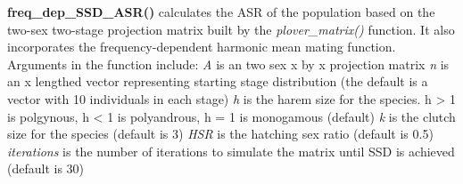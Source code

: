 \documentclass[]{article}
\newenvironment{Shaded}{\begin{snugshade}}{\end{snugshade}}
\newcommand{\KeywordTok}[1]{\textcolor[rgb]{0.13,0.29,0.53}{\textbf{{#1}}}}
\newcommand{\DataTypeTok}[1]{\textcolor[rgb]{0.13,0.29,0.53}{{#1}}}
\newcommand{\DecValTok}[1]{\textcolor[rgb]{0.00,0.00,0.81}{{#1}}}
\newcommand{\StringTok}[1]{\textcolor[rgb]{0.31,0.60,0.02}{{#1}}}
\newcommand{\OtherTok}[1]{\textcolor[rgb]{0.56,0.35,0.01}{{#1}}}
\newcommand{\NormalTok}[1]{{#1}}
\begin{document}
\begin{Shaded}
\end{Shaded}

\textbf{freq\_dep\_SSD\_ASR()} calculates the ASR of the population
based on the two-sex two-stage projection matrix built by the
\emph{plover\_matrix()} function. It also incorporates the
frequency-dependent harmonic mean mating function. Arguments in the
function include: \emph{A} is an two sex x by x projection matrix
\emph{n} is an x lengthed vector representing starting stage
distribution (the default is a vector with 10 individuals in each stage)
\emph{h} is the harem size for the species. h \textgreater{} 1 is
polgynous, h \textless{} 1 is polyandrous, h = 1 is monogamous (default)
\emph{k} is the clutch size for the species (default is 3) \emph{HSR} is
the hatching sex ratio (default is 0.5) \emph{iterations} is the number
of iterations to simulate the matrix until SSD is achieved (default is
30)
\end{document}
